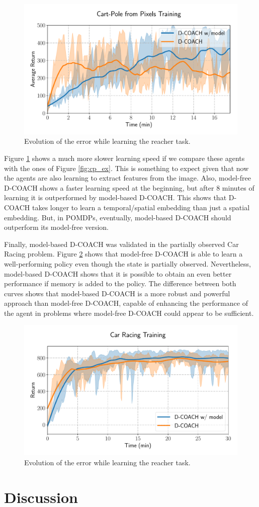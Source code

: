 \begin{figure}[h]
    \centering
    \includegraphics[width=0.9\linewidth]{imagenes/cap3/cartpole_HD_model.pdf}
    \caption{Evolution of the error while learning the reacher task. }
    \label{fig:cp_hd}
\end{figure}

Figure \ref{fig:cp_hd} shows a much more slower learning speed if we compare these agents with the ones of Figure \ref{fig:cp_ex}. This is something to expect given that now the agents are also learning to extract features from the image. Also, model-free D-COACH shows a faster learning speed at the beginning, but after 8 minutes of learning it is outperformed by model-based D-COACH. This shows that D-COACH takes longer to learn a temporal/spatial embedding than just a spatial embedding. But, in POMDPs, eventually, model-based D-COACH should outperform its model-free version.

Finally, model-based D-COACH was validated in the partially observed Car Racing problem. Figure \ref{fig:po_cr} shows that model-free D-COACH is able to learn a well-performing policy even though the state is partially observed. Nevertheless, model-based D-COACH shows that it is possible to obtain an even better performance if memory is added to the policy. The difference between both curves shows that model-based D-COACH is a more robust and powerful approach than model-free D-COACH, capable of enhancing the performance of the agent in problems where model-free D-COACH could appear to be sufficient.

\begin{figure}[h]
    \centering
    \includegraphics[width=0.9\linewidth]{imagenes/cap3/car_racing_lstm.pdf}
    \caption{Evolution of the error while learning the reacher task. }
    \label{fig:po_cr}
\end{figure}

\section{Discussion}